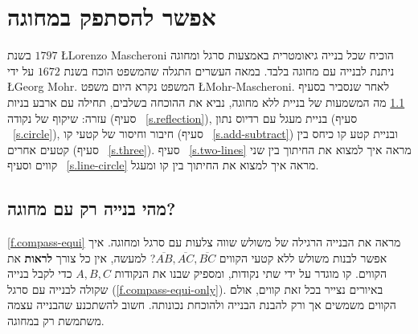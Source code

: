 


\chapter{אפשר להסתפק במחוגה}\label{c.compass}


בשנת
$1797$
\L{Lorenzo Mascheroni}
הוכיח שכל בנייה גיאומטרית באמצעות סרגל ומחוגה ניתנת לבנייה עם מחוגה בלבד. במאה העשרים התגלה שהמשפט הוכח בשנת
$1672$
על ידי
\L{Georg Mohr}.
המשפט נקרא היום משפט
\L{Mohr-Mascheroni}.
לאחר שנסביר בסעיף%
~\ref{s.compass-what}
מה המשמעות של בניית ללא מחוגה, נביא את ההוכחה בשלבים, תחילה עם ארבע בניות עזרה: שיקוף של נקודה (סעיף%
~\ref{s.reflection}),
בניית מעגל עם רדיוס נתון (סעיף%
~\ref{s.circle}),
חיבור וחיסור של קטעי קו (סעיף%
~\ref{s.add-subtract})
ובניית קטע קו כיחס בין קטעים אחרים (סעיף%
~\ref{s.three}).
סעיף%
~\ref{s.two-lines}
מראה איך למצוא את החיתוך בין שני קווים וסעיף%
~\ref{s.line-circle}
מראה איך למצוא את החיתוך בין קו ומעגל.


\section{מהי בנייה רק עם מחוגה?}\label{s.compass-what}

\ref{f.compass-equi}
מראה את הבנייה הרגילה של משולש שווה צלעות עם סרגל ומחוגה. איך אפשר לבנות משולש ללא קטעי הקווים
$\overline{AB},\overline{AC},\overline{BC}$?
למעשה, אין כל צורך
\textbf{לראות}
את הקווים. קו מוגדר על ידי שתי נקודות, ומספיק שבנו את הנקודות 
$A,B,C$
 כדי לקבל בנייה שקולה לבנייה עם סרגל 
(\ref{f.compass-equi-only}).
באיורים נצייר בכל זאת קווים, אולם הקווים משמשים אך ורק להבנת הבנייה ולהוכחת נכונותה. חשוב להשתכנע שהבנייה עצמה משתמשת רק במחוגה.

